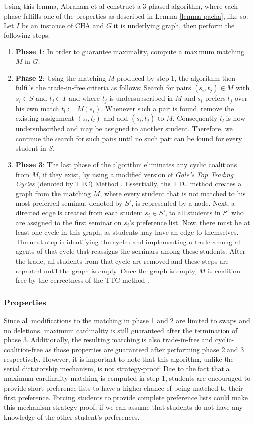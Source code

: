 Using this lemma, Abraham et al \cite{Abraham:Pacha} construct a 3-phased algorithm, where each phase fulfills one of the properties as described in Lemma \ref{lemma-pacha}, like so: Let $I$ be an instance of CHA and $G$ it is underlying graph, then perform the following steps:
\begin{enumerate}
    \item \textbf{Phase 1}: In order to guarantee maximality, compute a maximum matching $M$ in $G$.
    \item \textbf{Phase 2}: Using the matching $M$ produced by step 1, the algorithm then fulfills the trade-in-free criteria as follows: Search for pairs $(s_i, t_j) \in M$ with $s_i \in S$ and $t_j \in T$ and where $t_j$ is undersubscribed in $M$ and $s_i$ prefers $t_j$ over his own match $t_l := M(s_i)$. Whenever such a pair is found, remove the existing assignment $(s_i, t_l)$ and add $(s_i, t_j)$ to $M$. Consequently $t_l$ is now undersubscribed and may be assigned to another student. Therefore, we continue the search for such pairs until no such pair can be found for every student in $S$.
    \item \textbf{Phase 3}: The last phase of the algorithm eliminates any cyclic coalitions from $M$, if they exist, by using a modified version of \emph{Gale's Top Trading Cycles} (denoted by TTC) Method \cite{ShapleyTTC}. Essentially, the TTC method creates a graph from the matching $M$, where every student that is not matched to his most-preferred seminar, denoted by $S'$, is represented by a node. Next, a directed edge is created from each student $s_i \in S'$, to all students in $S'$ who are assigned to the first seminar on $s_i$'s preference list. Now, there must be at least one cycle in this graph, as students may have an edge to themselves. The next step is identifying the cycles and implementing a trade among all agents of that cycle that reassigns the seminars among these students. After the trade, all students from that cycle are removed and these steps are repeated until the graph is empty. Once the graph is empty, $M$ is coalition-free by the correctness of the TTC method \cite{Abraham:Pacha}.
\end{enumerate}

\subsubsection{Properties}
Since all modifications to the matching in phase 1 and 2 are limited to swaps and no deletions, maximum cardinality is still guaranteed after the termination of phase 3. Additionally, the resulting matching is also trade-in-free and cyclic-coalition-free as those properties are guaranteed after performing phase 2 and 3 respectively. However, it is important to note that this algorithm, unlike the serial dictatorship mechanism, is not strategy-proof: Due to the fact that a maximum-cardinality matching is computed in step 1, students are encouraged to provide short preference lists to have a higher chance of being matched to their first preference. Forcing students to provide complete preference lists could make this mechanism strategy-proof, if we can assume that students do not have any knowledge of the other student's preferences.

